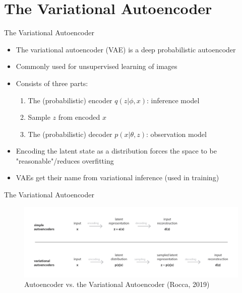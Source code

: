 \documentclass[10pt]{beamer}
\begin{document}
\section{The Variational Autoencoder}
\frame{\sectionpage}

\begin{frame}{The Variational Autoencoder}
\begin{itemize}
\item The variational autoencoder (VAE) is a {\color{uured} deep probabilistic autoencoder}
\item Commonly used for unsupervised learning of {\color{uured} images}\pause
\item Consists of {\color{uured} three parts}:
\begin{enumerate}
\item The (probabilistic) encoder $q(z|\phi, x)$: inference model
\item Sample $z$ from encoded $x$
\item The (probabilistic) decoder $p(x|\theta, z)$: observation model
\end{enumerate}
\pause
\item Encoding the {\color{uured} latent state as a distribution} forces the space to be "reasonable"/reduces overfitting
\pause
\item VAEs get their name from {\color{uured} variational inference} (used in training)
\end{itemize}

\end{frame}


\begin{frame}{The Variational Autoencoder}

\begin{figure}[h]
\centering
\includegraphics[width=1\textwidth]{fig/Rocca_AE_vs_VAE.png}
\caption{Autoencoder vs. the Variational Autoencoder (Rocca, 2019)}
\end{figure}

\end{frame}
\end{document}
